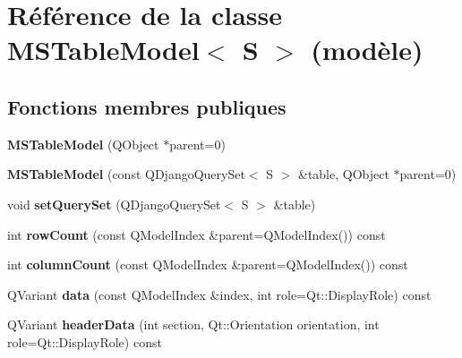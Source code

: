 \hypertarget{class_m_s_table_model}{
\section{Référence de la classe MSTableModel$<$ S $>$ (modèle)}
\label{d4/dfd/class_m_s_table_model}
}
\subsection*{Fonctions membres publiques}
\begin{DoxyCompactItemize}
\item 
\hypertarget{class_m_s_table_model_a0c3c96827752b4a6f035c5698db41e77}{
{\bfseries MSTableModel} (QObject $\ast$parent=0)}
\label{d4/dfd/class_m_s_table_model_a0c3c96827752b4a6f035c5698db41e77}

\item 
\hypertarget{class_m_s_table_model_ae08a20072e5f133706c763d0f91f3d66}{
{\bfseries MSTableModel} (const QDjangoQuerySet$<$ S $>$ \&table, QObject $\ast$parent=0)}
\label{d4/dfd/class_m_s_table_model_ae08a20072e5f133706c763d0f91f3d66}

\item 
\hypertarget{class_m_s_table_model_a45bf321168ccb70f3ddf2728d779849a}{
void {\bfseries setQuerySet} (QDjangoQuerySet$<$ S $>$ \&table)}
\label{d4/dfd/class_m_s_table_model_a45bf321168ccb70f3ddf2728d779849a}

\item 
\hypertarget{class_m_s_table_model_a45c9efc2c66d316329406304dc3752d6}{
int {\bfseries rowCount} (const QModelIndex \&parent=QModelIndex()) const }
\label{d4/dfd/class_m_s_table_model_a45c9efc2c66d316329406304dc3752d6}

\item 
\hypertarget{class_m_s_table_model_a6678e120edc1a5d28f3713a0d5f5e144}{
int {\bfseries columnCount} (const QModelIndex \&parent=QModelIndex()) const }
\label{d4/dfd/class_m_s_table_model_a6678e120edc1a5d28f3713a0d5f5e144}

\item 
\hypertarget{class_m_s_table_model_a66832fb6bea1e57daa6270c3df846cd2}{
QVariant {\bfseries data} (const QModelIndex \&index, int role=Qt::DisplayRole) const }
\label{d4/dfd/class_m_s_table_model_a66832fb6bea1e57daa6270c3df846cd2}

\item 
\hypertarget{class_m_s_table_model_aad624d93e35837323251264e35e1e9c2}{
QVariant {\bfseries headerData} (int section, Qt::Orientation orientation, int role=Qt::DisplayRole) const }
\label{d4/dfd/class_m_s_table_model_aad624d93e35837323251264e35e1e9c2}

\end{DoxyCompactItemize}
